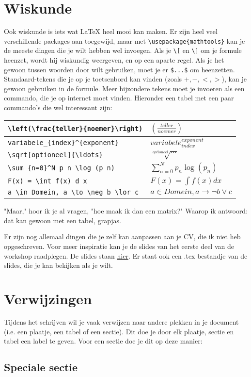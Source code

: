 \documentclass[a4paper,10pt]{article}
\begin{document}
\section{Wiskunde}
Ook wiskunde is iets wat LaTeX heel mooi kan maken. Er zijn heel veel verschillende packages aan toegewijd, maar met \verb|\usepackage{mathtools}| kan je de meeste dingen die je wilt hebben wel invoegen. Als je \verb|\[| en \verb|\]| om je formule heenzet, wordt hij wiskundig weergeven, en op een aparte regel. Als je het gewoon tussen woorden door wilt gebruiken, moet je er \verb|$...$| om heenzetten. Standaard-tekens die je op je toetsenbord kan vinden (zoals $+,-,<,>$), kan je gewoon gebruiken in de formule. Meer bijzondere tekens moet je invoeren als een commando, die je op internet moet vinden. Hieronder een tabel met een paar commando's die wel interessant zijn: 


\begin{tabular}{l | l}
\verb|\left(\frac{teller}{noemer}\right)| & \large{$\left(\frac{teller}{noemer}\right)$} \\ \hline
\verb|variabele_{index}^{exponent}| & \large{$variabele_{index}^{exponent}$} \\ \hline
\verb|\sqrt[optioneel]{\ldots}| & \large{$\sqrt[optioneel]{\ldots}$} \\ \hline
\verb|\sum_{n=0}^N p_n \log (p_n)| & \large{$\sum_{n=0}^N p_n \log (p_n)$} \\ \hline
\verb|F(x) = \int f(x) d x| & \large{$F(x) = \int f(x) d x$} \\ \hline
\verb|a \in Domein, a \to \neg b \lor c| & \large{$a \in Domein, a \to \neg b \lor c$} \\
\end{tabular}

"Maar," hoor ik je al vragen, "hoe maak ik dan een matrix?" Waarop ik antwoord: dat kan gewoon met een tabel, grapjas.

Er zijn nog allemaal dingen die je zelf kan aanpassen aan je CV, die ik niet heb opgeschreven. Voor meer inspiratie kan je de slides van het eerste deel van de workshop raadplegen. De slides staan \href{http://ctan.math.washington.edu/tex-archive/info/latex-course/}{hier}. Er staat ook een .tex bestandje van de slides, die je kan bekijken als je wilt.



\section{Verwijzingen}
\label{sec:verwijzingen}
Tijdens het schrijven wil je vaak verwijzen naar andere plekken in je document (i.e. een plaatje, een tabel of een sectie). Dit doe je door elk plaatje, sectie en tabel een label te geven. Voor een sectie doe je dit op deze manier: 
\begin{verbbox}
\section{Speciale sectie}
\label{sec:speciale-sectie}
\end{verbbox}
\theverbbox
\end{document}
